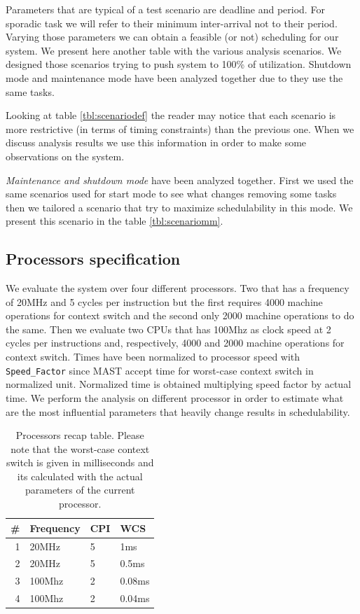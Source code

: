 \documentclass[10pt,a4paper]{report}
\begin{document}
Parameters that are typical of a test scenario are deadline and period. For 
sporadic task we will refer to their minimum inter-arrival not to their period. 
Varying those parameters we can obtain a feasible (or not) scheduling for our 
system. We present here another table with the various analysis scenarios. We 
designed those scenarios trying to push system to 100\% of utilization. 
Shutdown mode and maintenance mode have been analyzed together due to they use 
the same tasks. 

Looking at table \ref{tbl:scenariodef} the reader may notice that each scenario 
is more restrictive (in terms of timing constraints) than the previous one. When 
we discuss analysis results we use this information in order to make some 
observations on the system. 

\emph{Maintenance and shutdown mode} have been analyzed together. First we used 
the same scenarios used for start mode to see what changes removing some tasks 
then we tailored a scenario that try to maximize schedulability in this mode. We
present this scenario in the table \ref{tbl:scenariomm}.

\subsection{Processors specification}
We evaluate the system over four different processors. Two that has a frequency 
of 20MHz and 5 cycles per instruction but the first requires 4000 machine 
operations for context switch and the second only 2000 machine 
operations to do the same. Then we evaluate two CPUs that has 100Mhz as clock 
speed at 2 cycles per instructions and, respectively, 4000 and 2000 machine 
operations for context switch. Times have been normalized to processor 
speed with \texttt{Speed\_Factor} since MAST accept time for worst-case context 
switch in normalized unit. Normalized time is obtained multiplying speed factor 
by actual time.
We perform the analysis on different processor in order to estimate what are 
the most influential parameters that heavily change results in schedulability. 
\begin{table}[h!tb]
\centering
\begin{tabular}{|r lll|}
    \hline
    \textbf{\#} & \textbf{Frequency} & \textbf{CPI} & \textbf{WCS} \\
    \hline
    1 & 20MHz  & 5 & 1ms    \\
    2 & 20MHz  & 5 & 0.5ms  \\
    3 & 100Mhz & 2 & 0.08ms \\
    4 & 100Mhz & 2 & 0.04ms \\
    \hline
\end{tabular}
\caption{
    Processors recap table. Please note that the worst-case context switch is
    given in milliseconds and its calculated with the actual parameters of the
    current processor.  
}
\end{table}
\end{document}
